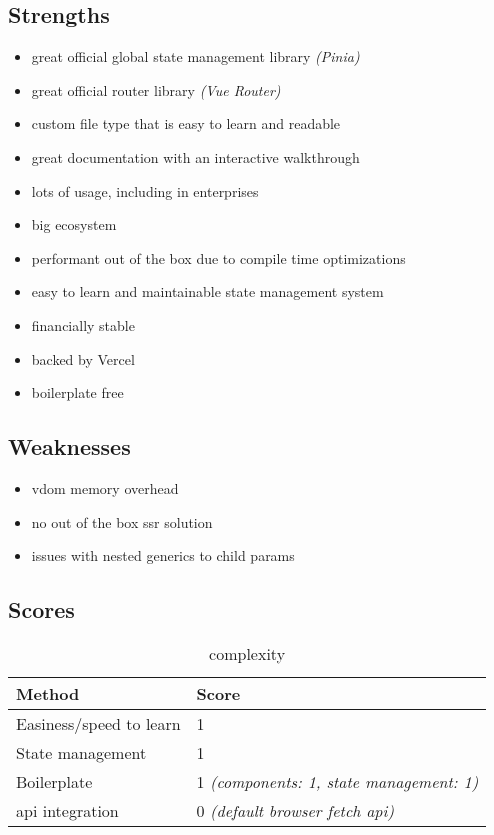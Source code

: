 \subsection{Strengths}
\label{subsec:vue:strengths}
\begin{itemize}
    \item great official global state management library \textit{(Pinia)}
    \item great official router library \textit{(Vue Router)}
    \item custom file type that is easy to learn and readable
    \item great documentation with an interactive walkthrough
    \item lots of usage, including in enterprises
    \item big ecosystem
    \item performant out of the box due to compile time optimizations
    \item easy to learn and maintainable state management system
    \item financially stable
    \item backed by Vercel
    \item boilerplate free
\end{itemize}

\subsection{Weaknesses}
\label{subsec:vue:weaknesses}
\begin{itemize}
    \item \acrshort{vdom} memory overhead
    \item no out of the box \acrshort{ssr} solution
    \item issues with nested generics to child params
\end{itemize}


\subsection{Scores}
\label{subsec:vue:scores}

\begin{table}[H]
    \centering
    \begin{tabular}{|l|l|}
        \hline
        \textbf{Method}            & \textbf{Score}                                    \\
        \hline
        Easiness/speed to learn    & 1                                                 \\ \hline
        State management           & 1                                                 \\ \hline
        Boilerplate                & 1 \textit{(components: 1, state management: 1)}   \\ \hline
        \acrshort{api} integration & 0 \textit{(default browser fetch \acrshort{api})} \\ \hline
    \end{tabular}
    \caption{complexity}
    \label{tab:vue:complexity}
\end{table}

